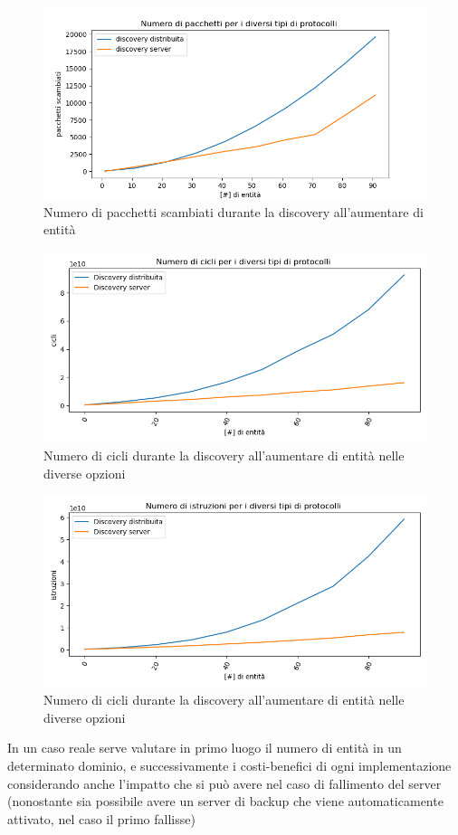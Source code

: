 \begin{figure}[H]
    \includegraphics[width=\textwidth]{./results/test0_packet.png} 
    \caption{Numero di pacchetti scambiati durante la discovery all'aumentare di entità}\label{fig:test0pack}
\end{figure}
\begin{figure}[H]
    \includegraphics[width=\textwidth]{./results/test0_cicli.png} 
    \caption{Numero di cicli durante la discovery all'aumentare di entità nelle diverse opzioni}\label{fig:test0cicl}
\end{figure}
\begin{figure}[H]
    \includegraphics[width=\textwidth]{./results/test0_istruzioni.png} 
    \caption{Numero di cicli durante la discovery all'aumentare di entità nelle diverse opzioni}\label{fig:test0_instr}
\end{figure}
In un caso reale serve valutare in primo luogo il numero di entità in un determinato dominio, e successivamente i costi-benefici di ogni implementazione considerando anche l'impatto che si può avere nel caso di fallimento del server (nonostante sia possibile avere un server di backup che viene automaticamente attivato, nel caso il primo fallisse)

